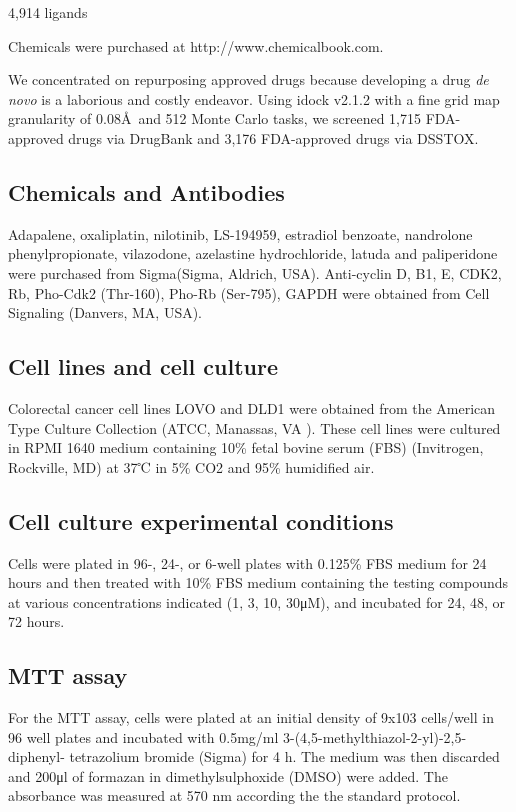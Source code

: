 4,914 ligands

Chemicals were purchased at http://www.chemicalbook.com.

We concentrated on repurposing approved drugs \citep{944,1023} because developing a drug \textit{de novo} is a laborious and costly endeavor. Using idock v2.1.2 with a fine grid map granularity of 0.08\AA\ and 512 Monte Carlo tasks, we screened 1,715 FDA-approved drugs via DrugBank and 3,176 FDA-approved drugs via DSSTOX.

\subsection{Chemicals and Antibodies}

Adapalene, oxaliplatin, nilotinib, LS-194959, estradiol benzoate, nandrolone phenylpropionate, vilazodone, azelastine hydrochloride, latuda and paliperidone were purchased from Sigma(Sigma, Aldrich, USA). Anti-cyclin D, B1, E, CDK2, Rb, Pho-Cdk2 (Thr-160), Pho-Rb (Ser-795), GAPDH were obtained from Cell Signaling (Danvers, MA, USA).

\subsection{Cell lines and cell culture}

Colorectal cancer cell lines LOVO and DLD1 were obtained from the American Type Culture Collection (ATCC, Manassas, VA ). These cell lines were cultured in RPMI 1640 medium containing 10\% fetal bovine serum (FBS) (Invitrogen, Rockville, MD) at 37℃ in 5\% CO2 and 95\% humidified air.

\subsection{Cell culture experimental conditions}

Cells were plated in 96-, 24-, or 6-well plates with 0.125\% FBS medium for 24 hours and then treated with 10\% FBS medium containing the testing compounds at various concentrations indicated (1, 3, 10, 30μM), and incubated for 24, 48, or 72 hours.

\subsection{MTT assay}

For the MTT assay, cells were plated at an initial density of 9x103 cells/well in 96 well plates and incubated with 0.5mg/ml 3-(4,5-methylthiazol-2-yl)-2,5-diphenyl- tetrazolium bromide (Sigma) for 4 h. The medium was then discarded and 200μl of formazan in dimethylsulphoxide (DMSO) were added. The absorbance was measured at 570 nm according the the standard protocol.

